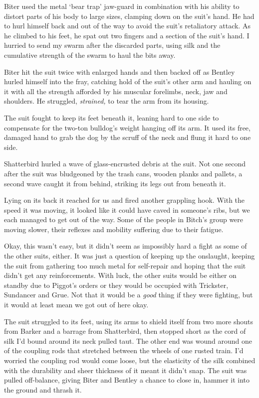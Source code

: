 Biter used the metal `bear trap' jaw-guard in combination with his ability to distort parts of his body to large sizes, clamping down on the suit's hand.  He had to hurl himself back and out of the way to avoid the suit's retaliatory attack.  As he climbed to his feet, he spat out two fingers and a section of the suit's hand.  I hurried to send my swarm after the discarded parts, using silk and the cumulative strength of the swarm to haul the bits away.



Biter hit the suit twice with enlarged hands and then backed off as Bentley hurled himself into the fray, catching hold of the suit's other arm and hauling on it with all the strength afforded by his muscular forelimbs, neck, jaw and shoulders.  He struggled, \emph{strained, }to tear the arm from its housing.



The suit fought to keep its feet beneath it, leaning hard to one side to compensate for the two-ton bulldog's weight hanging off its arm.  It used its free, damaged hand to grab the dog by the scruff of the neck and flung it hard to one side.



Shatterbird hurled a wave of glass-encrusted debris at the suit.  Not one second after the suit was bludgeoned by the trash cans, wooden planks and pallets, a second wave caught it from behind, striking its legs out from beneath it.



Lying on its back it reached for us and fired another grappling hook.  With the speed it was moving, it looked like it could have caved in someone's ribs, but we each managed to get out of the way.  Some of the people in Bitch's group were moving slower, their reflexes and mobility suffering due to their fatigue.



Okay, this wasn't easy, but it didn't seem as impossibly hard a fight as some of the other suits, either.  It was just a question of keeping up the onslaught, keeping the suit from gathering too much metal for self-repair and hoping that the suit didn't get any reinforcements.  With luck, the other suits would be either on standby due to Piggot's orders or they would be occupied with Trickster, Sundancer and Grue.  Not that it would be a \emph{good} thing if they were fighting, but it would at least mean we got out of here okay.



The suit struggled to its feet, using its arms to shield itself from two more shouts from Barker and a barrage from Shatterbird, then stopped short as the cord of silk I'd bound around its neck pulled taut.  The other end was wound around one of the coupling rods that stretched between the wheels of one rusted train.  I'd worried the coupling rod would come loose, but the elasticity of the silk combined with the durability and sheer thickness of it meant it didn't snap.  The suit was pulled off-balance, giving Biter and Bentley a chance to close in, hammer it into the ground and thrash it.



